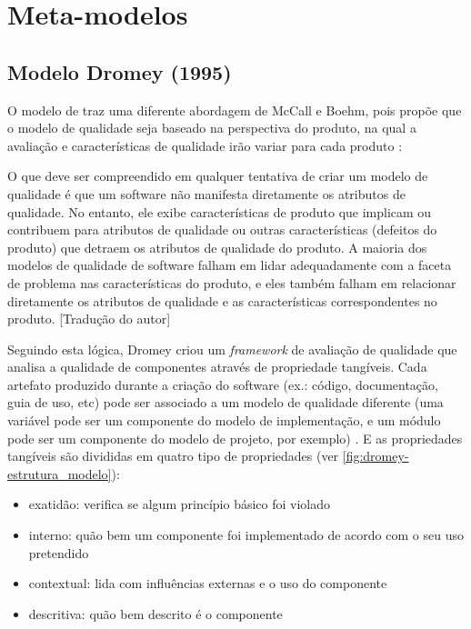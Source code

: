 \documentclass[
	12pt,				%
	openright,			%
	oneside,			%
	a4paper,			%
	english,			%
	brazil,				%
	]{abntex2}
\begin{document}
\section{Meta-modelos}
\subsection{Modelo Dromey (1995)}

O modelo de  traz uma diferente abordagem de McCall e Boehm, pois propõe que o modelo de qualidade seja baseado na perspectiva do produto, na qual a avaliação e características de qualidade irão variar para cada produto \cite{SURYN2014}:

\begin{citacao}
O que deve ser compreendido em qualquer tentativa de criar um modelo de qualidade é que um software não manifesta diretamente os atributos de qualidade. No entanto, ele exibe características de produto que implicam ou contribuem para atributos de qualidade ou outras características (defeitos do produto) que detraem os atributos de qualidade do produto. A maioria dos modelos de qualidade de software falham em lidar adequadamente com a faceta de problema nas características do produto, e eles também falham em relacionar diretamente os atributos de qualidade e as características correspondentes no produto. [Tradução do autor] \cite{Dromey1995}
\end{citacao}

Seguindo esta lógica, Dromey criou um \emph{framework} de avaliação de qualidade que analisa a qualidade de componentes através de propriedade tangíveis. Cada artefato produzido durante a criação do software (ex.: código, documentação, guia de uso, etc) pode ser associado a um modelo de qualidade diferente (uma variável pode ser um componente do modelo de implementação, e um módulo pode ser um componente do modelo de projeto, por exemplo) \cite{SURYN2014}. E as propriedades tangíveis são divididas em quatro tipo de propriedades (ver \autoref{fig:dromey-estrutura_modelo}):

\begin{itemize}
    \item exatidão: verifica se algum princípio básico foi violado
    \item interno: quão bem um componente foi implementado de acordo com o seu uso pretendido
    \item contextual: lida com influências externas e o uso do componente
    \item descritiva: quão bem descrito é o componente
\end{itemize}
\end{document}
